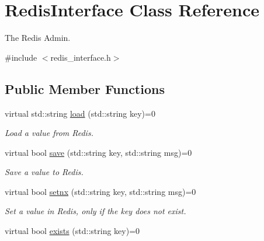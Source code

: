 \hypertarget{classRedisInterface}{\section{Redis\-Interface Class Reference}
\label{classRedisInterface}
}


The Redis Admin.  




{\ttfamily \#include $<$redis\-\_\-interface.\-h$>$}

\subsection*{Public Member Functions}
\begin{DoxyCompactItemize}
\item 
\hypertarget{classRedisInterface_a13dca0045887adbf90dd8f11c007d02d}{virtual std\-::string \hyperlink{classRedisInterface_a13dca0045887adbf90dd8f11c007d02d}{load} (std\-::string key)=0}\label{classRedisInterface_a13dca0045887adbf90dd8f11c007d02d}

\begin{DoxyCompactList}\small\item\em Load a value from Redis. \end{DoxyCompactList}\item 
\hypertarget{classRedisInterface_a60b25df720d353d426567f10a8fca483}{virtual bool \hyperlink{classRedisInterface_a60b25df720d353d426567f10a8fca483}{save} (std\-::string key, std\-::string msg)=0}\label{classRedisInterface_a60b25df720d353d426567f10a8fca483}

\begin{DoxyCompactList}\small\item\em Save a value to Redis. \end{DoxyCompactList}\item 
\hypertarget{classRedisInterface_aadbf5e9040bd896e9411da407459e426}{virtual bool \hyperlink{classRedisInterface_aadbf5e9040bd896e9411da407459e426}{setnx} (std\-::string key, std\-::string msg)=0}\label{classRedisInterface_aadbf5e9040bd896e9411da407459e426}

\begin{DoxyCompactList}\small\item\em Set a value in Redis, only if the key does not exist. \end{DoxyCompactList}\item 
\hypertarget{classRedisInterface_a1ddea059a6bc0c4503cd98ef520beac0}{virtual bool \hyperlink{classRedisInterface_a1ddea059a6bc0c4503cd98ef520beac0}{exists} (std\-::string key)=0}\label{classRedisInterface_a1ddea059a6bc0c4503cd98ef520beac0}


\end{DoxyCompactItemize}
